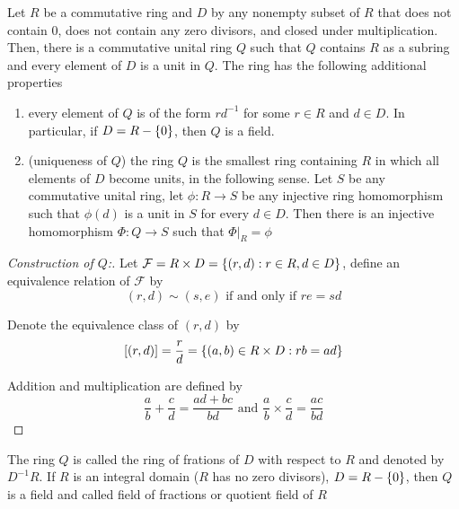 \begin{theorem}
	Let $R$ be a commutative ring and $D$ by any nonempty subset of $R$ that does not contain $0$, does not contain any zero divisors, and closed under multiplication. Then, there is a commutative unital ring $Q$ such that $Q$ contains $R$ as a subring and every element of $D$ is a unit in $Q$. The ring has the following additional properties
	\begin{enumerate}
		\item every element of $Q$ is of the form $r d^{-1}$ for some $r \in R$ and $d \in D$. In particular, if $D = R - \{0\}$, then $Q$ is a field.
		
		\item (uniqueness of $Q$) the ring $Q$ is the smallest ring containing $R$ in which all elements of $D$ become units, in the following sense. Let $S$ be any commutative unital ring, let $\phi: R \to S$ be any injective ring homomorphism such that $\phi(d)$ is a unit in $S$ for every $d \in D$. Then there is an injective homomorphism $\Phi: Q \to S$ such that $\Phi\vert_R = \phi$
		\begin{center}
		\end{center}
	\end{enumerate}
	\begin{proof}[Construction of $Q$:]
		Let $\mathcal{F} = R \times D = \{(r, d): r \in R, d \in D\}$, define an equivalence relation of $\mathcal{F}$ by
		$$
			(r, d) \sim (s, e) \text{ if and only if } re = sd
		$$
		
		Denote the equivalence class of $(r, d)$ by
		$$
			[(r, d)] = \frac{r}{d} = \{(a, b) \in R \times D: rb = ad\}
		$$
		
		Addition and multiplication are defined by
		$$
			\frac{a}{b} + \frac{c}{d} = \frac{ad + bc}{bd} \text{ and } \frac{a}{b} \times \frac{c}{d} = \frac{ac}{bd}
		$$
	\end{proof}
\end{theorem}

\begin{definition}
	The ring $Q$ is called the ring of frations of $D$ with respect to $R$ and denoted by $D^{-1} R$. If $R$ is an integral domain ($R$ has no zero divisors), $D = R - \{0\}$, then $Q$ is a field and called field of fractions or quotient field of $R$
\end{definition}

